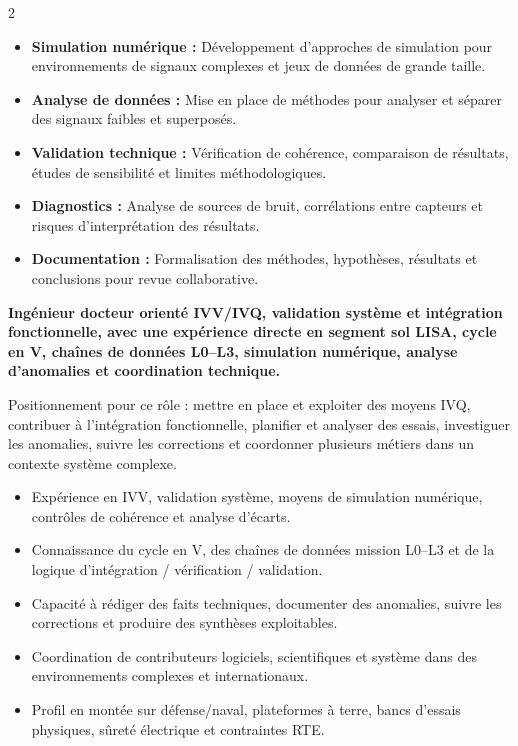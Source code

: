 \documentclass[8pt,a4paper,ragged2e,withhyper]{altacv}
\begin{document}
\begin{paracol}{2}
\begin{itemize}
  \item \textbf{Simulation numérique :} Développement d’approches de simulation pour environnements de signaux complexes et jeux de données de grande taille.
  \item \textbf{Analyse de données :} Mise en place de méthodes pour analyser et séparer des signaux faibles et superposés.
  \item \textbf{Validation technique :} Vérification de cohérence, comparaison de résultats, études de sensibilité et limites méthodologiques.
  \item \textbf{Diagnostics :} Analyse de sources de bruit, corrélations entre capteurs et risques d’interprétation des résultats.
  \item \textbf{Documentation :} Formalisation des méthodes, hypothèses, résultats et conclusions pour revue collaborative.
\end{itemize}

\switchcolumn


\textbf{Ingénieur docteur orienté IVV/IVQ, validation système et intégration fonctionnelle, avec une expérience directe en segment sol LISA, cycle en V, chaînes de données L0--L3, simulation numérique, analyse d’anomalies et coordination technique.}

Positionnement pour ce rôle : mettre en place et exploiter des moyens IVQ, contribuer à l’intégration fonctionnelle, planifier et analyser des essais, investiguer les anomalies, suivre les corrections et coordonner plusieurs métiers dans un contexte système complexe.

\begin{itemize}
  \item Expérience en IVV, validation système, moyens de simulation numérique, contrôles de cohérence et analyse d’écarts.
  \item Connaissance du cycle en V, des chaînes de données mission L0--L3 et de la logique d’intégration / vérification / validation.
  \item Capacité à rédiger des faits techniques, documenter des anomalies, suivre les corrections et produire des synthèses exploitables.
  \item Coordination de contributeurs logiciels, scientifiques et système dans des environnements complexes et internationaux.
  \item Profil en montée sur défense/naval, plateformes à terre, bancs d’essais physiques, sûreté électrique et contraintes RTE.
\end{itemize}


\end{paracol}
\end{document}
